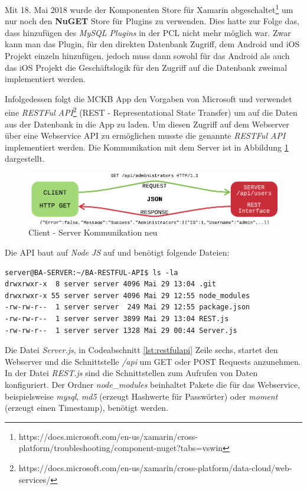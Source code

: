 	Mit 18. Mai 2018 wurde der Komponenten Store für Xamarin abgeschaltet\footnote{https://docs.microsoft.com/en-us/xamarin/cross-platform/troubleshooting/component-nuget?tabs=vswin} um nur noch den \textbf{NuGET} Store für Plugins zu verwenden. Dies hatte zur Folge das, dass hinzufügen des \textit{MySQL Plugins} in der PCL nicht mehr möglich war. Zwar kann man das Plugin, für den direkten Datenbank Zugriff, dem Android und iOS Projekt einzeln hinzufügen, jedoch muss dann sowohl für das Android als auch das iOS Projekt die Geschäftslogik für den Zugriff auf die Datenbank zweimal implementiert werden.

	Infolgedessen folgt die MCKB App den Vorgaben von Microsoft und verwendet eine \textit{RESTFul API}\footnote{https://docs.microsoft.com/en-us/xamarin/cross-platform/data-cloud/web-services/} (REST - Representational State Transfer) um auf die Daten aus der Datenbank in die App zu laden. Um diesen Zugriff auf dem Webserver über eine Webservice API zu ermöglichen musste die genannte \textit{RESTFul API} implementiert werden. Die Kommunikation mit dem Server ist in Abbildung \ref{fig:restfulcommunication} dargestellt.

	\begin{figure}[h!]
		\centering
		\includegraphics[width=1\textwidth]{images/restfull-communication.png}
		\caption{Client - Server Kommunikation neu}
		\label{fig:restfulcommunication}
	\end{figure}

	Die API baut auf \textit{Node JS} auf und benötigt folgende Dateien:
	\begin{lstlisting}[caption={Webservice Aufbau},label={lst:restfulapi},captionpos=b,style=JAVA-Own]
server@BA-SERVER:~/BA-RESTFUL-API$ ls -la
drwxrwxr-x  8 server server 4096 Mai 29 13:04 .git
drwxrwxr-x 55 server server 4096 Mai 29 12:55 node_modules
-rw-rw-r--  1 server server  249 Mai 29 12:55 package.json
-rw-rw-r--  1 server server 3899 Mai 29 13:04 REST.js
-rw-rw-r--  1 server server 1328 Mai 29 00:44 Server.js
	\end{lstlisting}
	
	Die Datei \textit{Server.js}, in Codeabschnitt \ref{lst:restfulapi} Zeile sechs, startet den Webserver und die Schnittstelle \textit{/api} um GET oder POST Requests anzunehmen. In der Datei \textit{REST.js} sind die Schnittstellen zum Aufrufen von Daten konfiguriert. Der Ordner \textit{node\_modules} beinhaltet Pakete die für das Webservice, beispielsweise \textit{mysql}, \textit{md5} (erzeugt Hashwerte für Passwörter) oder \textit{moment} (erzeugt einen Timestamp), benötigt werden.


